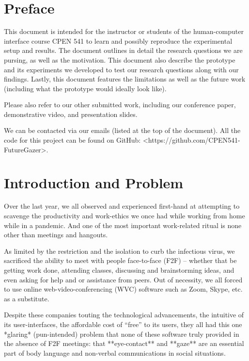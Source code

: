 \documentclass[10pt,letterpaper]{article}
\begin{document}


\section*{Preface}

This document is intended for the instructor or students of the human-computer interface course CPEN 541 to learn and possibly reproduce the experimental setup and results. The document outlines in detail the research questions we are pursing, as well as the motivation. This document also describe the prototype and its experiments we developed to test our research questions along with our findings. Lastly, this document features the limitations as well as the future work (including what the prototype would ideally look like). 

Please also refer to our other submitted work, including our conference paper, demonstrative video, and presentation slides.

We can be contacted via our emails (listed at the top of the document). All the code for this project can be found on GitHub: <https://github.com/CPEN541-FutureGazer>.

\clearpage

\section{Introduction and Problem}

Over the last year, we all observed and experienced first-hand at attempting to scavenge the productivity and work-ethics we once had while working from home while in a pandemic. And one of the most important work-related ritual is none other than meetings and hangouts. 

As limited by the restriction and the isolation to curb the infectious virus, we sacrificed the ability to meet with people face-to-face (F2F) -- whether that be getting work done, attending classes, discussing and brainstorming ideas, and even asking for help and or assistance from peers. Out of necessity, we all forced to use online web-video-conferencing (WVC) software such as Zoom, Skype, etc. as a substitute.

Despite these companies touting the technological advancements, the intuitive of its user-interfaces, the affordable cost of “free” to its users, they all had this one *glaring* (pun-intended) problem that none of these software truly provided in the absence of F2F meetings: that **eye-contact** and **gaze** are an essential part of body language and non-verbal communications in social situations. 
\end{document}
